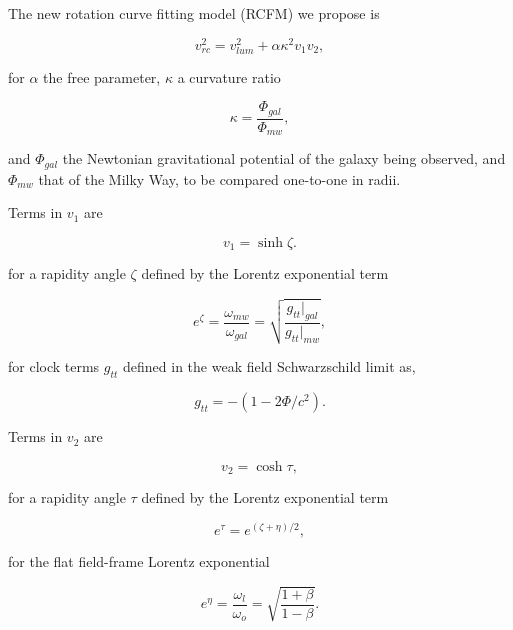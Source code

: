 \documentclass[reprint,%
 amsmath,amssymb,
 aps,
]{revtex4-1}
\begin{document}
   The new rotation curve fitting model (RCFM) we propose  is
   

\begin{equation}
v_{rc}^2 =  v_{lum}^2+\alpha \kappa^2 v_{1} v_{2},  
\label{eq:zonteLCM}
\end{equation}  

for $\alpha$  the free parameter,  
$\kappa$  a curvature ratio 

 \begin{equation}
\kappa=\frac{\Phi_{gal}}{\Phi_{mw}}, 
\label{eq:kappa2}  
\end{equation}  

 and $\Phi_{gal}$ the    Newtonian gravitational potential of the galaxy being observed, and $\Phi_{mw}$ that of  the Milky Way, to be compared one-to-one in radii. 


 Terms in $v_1$   are   
 
   \begin{equation}
       v_1 = \sinh \zeta. 
   \end{equation}
 
 for a rapidity angle $\zeta$ defined by the    Lorentz exponential  term  
  
   
     \begin{equation}
     e^{\zeta}=  \frac{\omega_{mw}}{\omega_{gal}}  =\sqrt{\frac{g_{tt}|_{gal}}{g_{tt}|_{mw}}},
      \label{eq:gravRS}
    \end{equation}
    
 for  clock terms $g_{tt}$   defined in the   weak field Schwarzschild limit  \cite{Hartle} as, 
 
  \begin{equation}
      g_{tt}= -( 1 - 2\Phi/ c^2).
      \label{clocktime}
  \end{equation} 
  

Terms in $v_2$ are 

\begin{equation}
v_{2} =  \cosh \tau, 
\label{eq:hyperbolico}
\end{equation}


 
 
  for a rapidity angle $\tau$ defined by the    Lorentz exponential  term  
  
 
\begin{equation}
    e^{\tau}=   e^{(\zeta+\eta)/2},
\end{equation}
 
for the  flat field-frame
Lorentz exponential  

\begin{equation}
    e^{\eta}=\frac{\omega_{l}}{\omega_o}= \sqrt{\frac{1+\beta}{1-\beta}}.
    \label{eq:flat}
\end{equation}  
     
\end{document}
